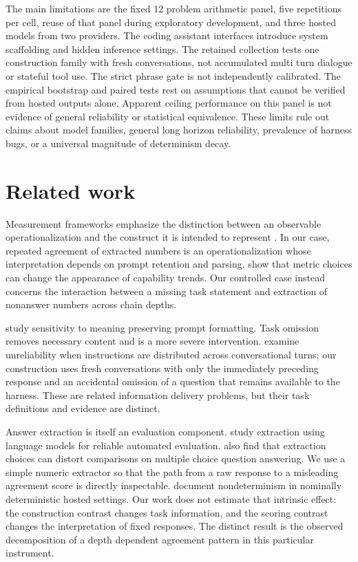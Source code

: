 \documentclass{article}
\begin{document}
The main limitations are the fixed 12 problem arithmetic panel, five repetitions per cell, reuse of that panel during exploratory development, and three hosted models from two providers. The coding assistant interfaces introduce system scaffolding and hidden inference settings. The retained collection tests one construction family with fresh conversations, not accumulated multi turn dialogue or stateful tool use. The strict phrase gate is not independently calibrated. The empirical bootstrap and paired tests rest on assumptions that cannot be verified from hosted outputs alone. Apparent ceiling performance on this panel is not evidence of general reliability or statistical equivalence. These limits rule out claims about model families, general long horizon reliability, prevalence of harness bugs, or a universal magnitude of determinism decay.

\section{Related work}
\label{sec:related}
Measurement frameworks emphasize the distinction between an observable operationalization and the construct it is intended to represent \citep{jacobs2021measurement}. In our case, repeated agreement of extracted numbers is an operationalization whose interpretation depends on prompt retention and parsing. \citet{schaeffer2023mirage} show that metric choices can change the appearance of capability trends. Our controlled case instead concerns the interaction between a missing task statement and extraction of nonanswer numbers across chain depths.

\citet{sclar2024format} study sensitivity to meaning preserving prompt formatting. Task omission removes necessary content and is a more severe intervention. \citet{laban2026lost} examine unreliability when instructions are distributed across conversational turns; our construction uses fresh conversations with only the immediately preceding response and an accidental omission of a question that remains available to the harness. These are related information delivery problems, but their task definitions and evidence are distinct.

Answer extraction is itself an evaluation component. \citet{yu2025xfinder} study extraction using language models for reliable automated evaluation. \citet{molfese2025right} also find that extraction choices can distort comparisons on multiple choice question answering. We use a simple numeric extractor so that the path from a raw response to a misleading agreement score is directly inspectable. \citet{atil2025nondeterminism} document nondeterminism in nominally deterministic hosted settings. Our work does not estimate that intrinsic effect: the construction contrast changes task information, and the scoring contrast changes the interpretation of fixed responses. The distinct result is the observed decomposition of a depth dependent agreement pattern in this particular instrument.
\end{document}
